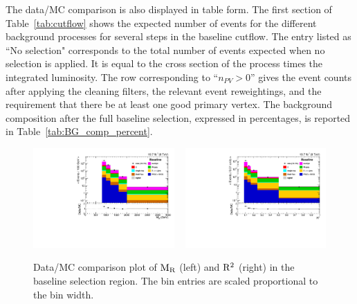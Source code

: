 The data/MC comparison is also displayed in table form. The first section of Table~\ref{tab:cutflow}
shows the expected number of events for the different background processes for several steps in the
baseline cutflow. The entry listed as ``No selection" corresponds to the total number of events
expected when no selection is applied. It is equal to the cross section of the process times the
integrated luminosity. 
The row corresponding to ``$n_{PV} > 0$'' gives the event counts after applying the
cleaning filters, the relevant event reweightings, and the requirement that there be at least one
good primary vertex.
The background composition after the full baseline selection, expressed in percentages, is reported
in Table~\ref{tab:BG_comp_percent}.  

\begin{figure}[htbp]
 \centering
 \includegraphics[width=0.48\textwidth]{figures/razor_selection/plots/DataMC_MR_HLT_width}
 ~
 \includegraphics[width=0.48\textwidth]{figures/razor_selection/plots/DataMC_R2_HLT_width}
 \caption{Data/MC comparison plot of $\mathrm{M_R}$ (left) and $\mathrm{R^2}$ (right) in the baseline selection
region. The bin entries are scaled proportional to the bin width.
 \label{fig:boost_baseline_dataMC}}
\end{figure}
